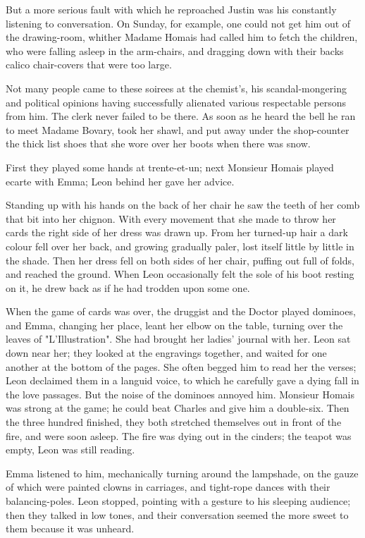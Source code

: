 \documentclass{tufte-book}
\begin{document}
But a more serious fault with which he reproached Justin was his
constantly listening to conversation. On Sunday, for example, one could
not get him out of the drawing-room, whither Madame Homais had called
him to fetch the children, who were falling asleep in the arm-chairs,
and dragging down with their backs calico chair-covers that were too
large.

Not many people came to these soirees at the chemist's, his
scandal-mongering and political opinions having successfully alienated
various respectable persons from him. The clerk never failed to be
there. As soon as he heard the bell he ran to meet Madame Bovary, took
her shawl, and put away under the shop-counter the thick list shoes that
she wore over her boots when there was snow.

First they played some hands at trente-et-un; next Monsieur Homais
played ecarte with Emma; Leon behind her gave her advice.

Standing up with his hands on the back of her chair he saw the teeth of
her comb that bit into her chignon. With every movement that she made
to throw her cards the right side of her dress was drawn up. From her
turned-up hair a dark colour fell over her back, and growing gradually
paler, lost itself little by little in the shade. Then her dress fell
on both sides of her chair, puffing out full of folds, and reached the
ground. When Leon occasionally felt the sole of his boot resting on it,
he drew back as if he had trodden upon some one.

When the game of cards was over, the druggist and the Doctor played
dominoes, and Emma, changing her place, leant her elbow on the table,
turning over the leaves of "L'Illustration". She had brought her ladies'
journal with her. Leon sat down near her; they looked at the engravings
together, and waited for one another at the bottom of the pages. She
often begged him to read her the verses; Leon declaimed them in a
languid voice, to which he carefully gave a dying fall in the love
passages. But the noise of the dominoes annoyed him. Monsieur Homais
was strong at the game; he could beat Charles and give him a double-six.
Then the three hundred finished, they both stretched themselves out in
front of the fire, and were soon asleep. The fire was dying out in the
cinders; the teapot was empty, Leon was still reading.

Emma listened to him, mechanically turning around the lampshade, on the
gauze of which were painted clowns in carriages, and tight-rope dances
with their balancing-poles. Leon stopped, pointing with a gesture to his
sleeping audience; then they talked in low tones, and their conversation
seemed the more sweet to them because it was unheard.
\end{document}
